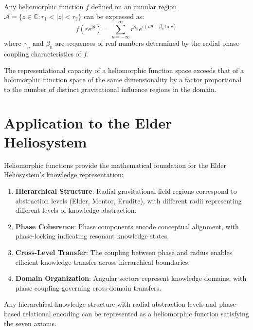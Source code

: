 \begin{theorem}
Any heliomorphic function $f$ defined on an annular region $\mathcal{A} = \{z \in \mathbb{C} : r_1 < |z| < r_2\}$ can be expressed as:
\begin{equation}
f(re^{i\theta}) = \sum_{n=-\infty}^{\infty} r^{\gamma_n} e^{i(n\theta + \beta_n \ln r)}
\end{equation}
where $\gamma_n$ and $\beta_n$ are sequences of real numbers determined by the radial-phase coupling characteristics of $f$.
\end{theorem}

\begin{theorem}
The representational capacity of a heliomorphic function space exceeds that of a holomorphic function space of the same dimensionality by a factor proportional to the number of distinct gravitational influence regions in the domain.
\end{theorem}

\section{Application to the Elder Heliosystem}

Heliomorphic functions provide the mathematical foundation for the Elder Heliosystem's knowledge representation:

\begin{enumerate}
    \item \textbf{Hierarchical Structure}: Radial gravitational field regions correspond to abstraction levels (Elder, Mentor, Erudite), with different radii representing different levels of knowledge abstraction.
    
    \item \textbf{Phase Coherence}: Phase components encode conceptual alignment, with phase-locking indicating resonant knowledge states.
    
    \item \textbf{Cross-Level Transfer}: The coupling between phase and radius enables efficient knowledge transfer across hierarchical boundaries.
    
    \item \textbf{Domain Organization}: Angular sectors represent knowledge domains, with phase coupling governing cross-domain transfers.
\end{enumerate}

\begin{theorem}
Any hierarchical knowledge structure with radial abstraction levels and phase-based relational encoding can be represented as a heliomorphic function satisfying the seven axioms.
\end{theorem}

